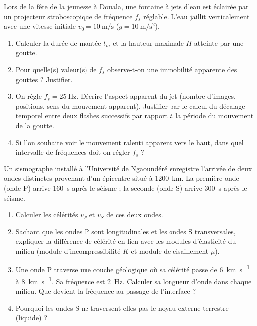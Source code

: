 \documentclass[11pt]{article}
\begin{document}
\begin{exercice}
Lors de la fête de la jeunesse à Douala, une fontaine à jets d'eau est éclairée par un projecteur stroboscopique de fréquence $f_s$ réglable. L'eau jaillit verticalement avec une vitesse initiale $v_0 = \SI{10}{\meter\per\second}$ ($g=\SI{10}{\meter\per\second\squared}$).
\begin{enumerate}
    \item Calculer la durée de montée $t_m$ et la hauteur maximale $H$ atteinte par une goutte.
    \item Pour quelle(s) valeur(s) de $f_s$ observe-t-on une immobilité apparente des gouttes ? Justifier.
    \item On règle $f_s = \SI{25}{\hertz}$. Décrire l'aspect apparent du jet (nombre d'images, positions, sens du mouvement apparent). Justifier par le calcul du décalage temporel entre deux flashes successifs par rapport à la période du mouvement de la goutte.
    \item Si l'on souhaite voir le mouvement ralenti apparent vers le haut, dans quel intervalle de fréquences doit-on régler $f_s$ ?
\end{enumerate}
\end{exercice}

\begin{exercice}
Un sismographe installé à l'Université de Ngaoundéré enregistre l'arrivée de deux ondes distinctes provenant d'un épicentre situé à \SI{1200}{\kilo\meter}. La première onde (onde P) arrive \SI{160}{\second} après le séisme ; la seconde (onde S) arrive \SI{300}{\second} après le séisme.
\begin{enumerate}
    \item Calculer les célérités $v_P$ et $v_S$ de ces deux ondes.
    \item Sachant que les ondes P sont longitudinales et les ondes S transversales, expliquer la différence de célérité en lien avec les modules d'élasticité du milieu (module d'incompressibilité $K$ et module de cisaillement $\mu$).
    \item Une onde P traverse une couche géologique où sa célérité passe de \SI{6}{\kilo\meter\per\second} à \SI{8}{\kilo\meter\per\second}. Sa fréquence est \SI{2}{\hertz}. Calculer sa longueur d'onde dans chaque milieu. Que devient la fréquence au passage de l'interface ?
    \item Pourquoi les ondes S ne traversent-elles pas le noyau externe terrestre (liquide) ?
\end{enumerate}
\end{exercice}
\end{document}
